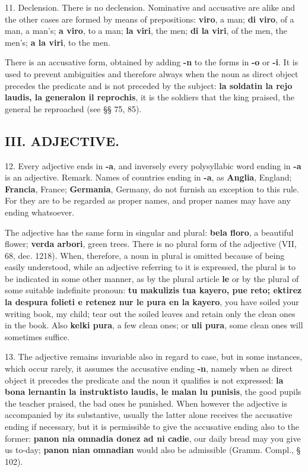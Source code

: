 11. Declension. There is no declension. Nominative and accusative are alike and the other cases are formed by means of prepositions: \textbf{viro}, a man; \textbf{di viro}, of a man, a man's; \textbf{a viro}, to a man; \textbf{la viri}, the men; \textbf{di la viri}, of the men, the men's; \textbf{a la viri}, to the men. 

There is an accusative form, obtained by adding \textbf{-n} to the forms in \textbf{-o} or \textbf{-i}. It is used to prevent ambiguities and therefore always when the noun as direct object precedes the predicate and is not preceded by the subject: \textbf{la soldatin la rejo laudis, la generalon il reprochis}, it is the soldiers that the king praised, the general he reproached (see §§ 75, 85).

\subsection*{III. ADJECTIVE.}
12. Every adjective ends in \textbf{-a}, and inversely every polysyllabic word ending in \textbf{-a} is an adjective. 
Remark. Names of countries ending in \textbf{-a}, as \textbf{Anglia}, England; \textbf{Francia}, France; \textbf{Germania}, Germany, do not furnish an exception to this rule. For they are to be regarded as proper names, and proper names may have any ending whatsoever.

The adjective has the same form in singular and plural: \textbf{bela floro}, a beautiful flower; \textbf{verda arbori}, green trees. There is no plural form of the adjective (VII, 68, dec. 1218). When, therefore, a noun in plural is omitted because of being easily understood, while an adjective referring to it is expressed, the plural is to be indicated in some other manner, as by the plural article \textbf{le} or by the plural of some suitable indefinite pronoun: \textbf{tu makulizis tua kayero, pue reto; ektirez la despura folieti e retenez nur le pura en la kayero}, you have soiled your writing book, my child; tear out the soiled leaves and retain only the clean ones in the book. Also \textbf{kelki pura}, a few clean ones; or \textbf{uli pura}, some clean ones will sometimes suffice. 

13. The adjective remains invariable also in regard to case, but in some instances, which occur rarely, it assumes the accusative ending \textbf{-n}, namely when as direct object it precedes the predicate and the noun it qualifies is not expressed: \textbf{la bona lernantin la instruktisto laudis, le malan lu punisis}, the good pupils the teacher praised, the bad ones he punished. When however the adjective is accompanied by its substantive, usually the latter alone receives the accusative ending if necessary, but it is permissible to give the accusative ending also to the former: \textbf{panon nia omnadia donez ad ni cadie}, our daily bread may you give us to-day; \textbf{panon nian omnadian} would also be admissible (Gramm. Compl., § 102).

